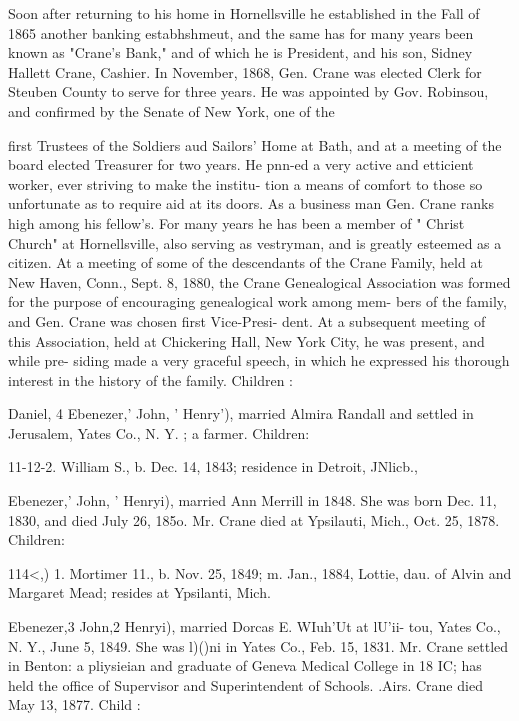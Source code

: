 \documentclass[oneside]{book}
\begin{document}
Soon after returning to his home in Hornellsville he established 
in the Fall of 1865 another banking estabhshmeut, and the same 
has for many years been known as "Crane's Bank," and of 
which he is President, and his son, Sidney Hallett Crane, Cashier. 
In November, 1868, Gen. Crane was elected Clerk for Steuben 
County to serve for three years. He was appointed by Gov. 
Robinsou, and confirmed by the Senate of New York, one of the 




first Trustees of the Soldiers aud Sailors' Home at Bath, and at a 
meeting of the board elected Treasurer for two years. He pnn-ed 
a very active and etticient worker, ever striving to make the institu- 
tion a means of comfort to those so unfortunate as to require aid 
at its doors. As a business man Gen. Crane ranks high among 
his fellow's. For many years he has been a member of " Christ 
Church" at Hornellsville, also serving as vestryman, and is 
greatly esteemed as a citizen. At a meeting of some of the 
descendants of the Crane Family, held at New Haven, Conn., 
Sept. 8, 1880, the Crane Genealogical Association was formed 
for the purpose of encouraging genealogical work among mem- 
bers of the family, and Gen. Crane was chosen first Vice-Presi- 
dent. At a subsequent meeting of this Association, held at 
Chickering Hall, New York City, he was present, and while pre- 
siding made a very graceful speech, in which he expressed his 
thorough interest in the history of the family. Children : 


Daniel, 4 Ebenezer,' John, ' Henry'), married Almira Randall and 
settled in Jerusalem, Yates Co., N. Y. ; a farmer. Children: 


11-12-2. William S., b. Dec. 14, 1843; residence in Detroit, JNlicb., 







Ebenezer,' John, ' Henryi), married Ann Merrill in 1848. She 
was born Dec. 11, 1830, and died July 26, 185o. Mr. Crane 
died at Ypsilauti, Mich., Oct. 25, 1878. Children: 

114<,) 1. Mortimer 11., b. Nov. 25, 1849; m. Jan., 1884, Lottie, dau. 
of Alvin and Margaret Mead; resides at Ypsilanti, Mich. 

Ebenezer,3 John,2 Henryi), married Dorcas E. WIuh'Ut at lU'ii- 
tou, Yates Co., N. Y., June 5, 1849. She was l)()ni in Yates 
Co., Feb. 15, 1831. Mr. Crane settled in Benton: a pliysieian 
and graduate of Geneva Medical College in 18 IC; has held the 
office of Supervisor and Superintendent of Schools. .Airs. Crane 
died May 13, 1877. Child : 
\end{document}
